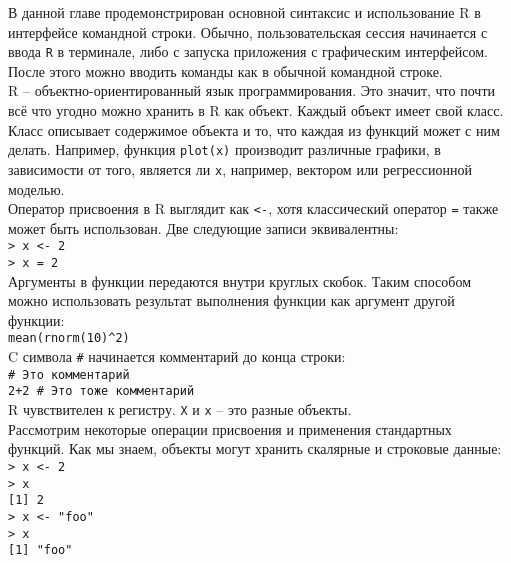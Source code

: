     В данной главе продемонстрирован основной синтаксис и использование R в интерфейсе 
    командной строки. Обычно, пользовательская сессия начинается с ввода \texttt{R} в 
    терминале, либо с запуска приложения с графическим интерфейсом. После этого можно вводить
    команды как в обычной командной строке.\\

    \indent R -- объектно-ориентированный язык программирования. Это значит, что почти всё что 
    угодно можно хранить в R как объект. Каждый объект имеет свой класс. Класс описывает
    содержимое объекта и то, что каждая из функций может с ним делать. Например, функция
    \texttt{plot(x)} производит различные графики, в зависимости от того, является ли 
    \texttt{x}, например, вектором или регрессионной моделью. \\
    
    \indent Оператор присвоения в R выглядит как \texttt{<-}, хотя классический оператор \texttt{=}
    также может быть использован. Две следующие записи эквивалентны: \\
    \indent \texttt{> x <- 2} \\
    \indent \texttt{> x = 2} \\ 
    
    \indent Аргументы в функции передаются внутри круглых скобок. Таким способом можно использовать 
    результат выполнения функции как аргумент другой функции: \\
    \indent \texttt{mean(rnorm(10)\^{}2)} \\ 
    
    \indent C символа \texttt{\#} начинается комментарий до конца строки: \\
    \indent \texttt{\# Это комментарий} \\
    \indent \texttt{2+2 \# Это тоже комментарий} \\ 
    
    \indent R чувствителен к регистру. \texttt{X} и \texttt{x} -- это разные объекты. \\
    
    \indent Рассмотрим некоторые операции присвоения и применения стандартных функций. Как мы
    знаем, объекты могут хранить скалярные и строковые данные: \\
    \indent \texttt{> x <- 2} \\
    \indent \texttt{> x} \\
    \indent \texttt{[1] 2} \\
    \indent \texttt{> x <- "foo"} \\
    \indent \texttt{> x } \\
    \indent \texttt{[1] "foo"} \\ 
    
